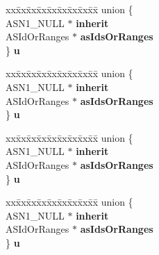 \begin{DoxyCompactItemize}
\begin{tabbing}
\end{tabbing}\item 
\mbox{\label{structASIdentifierChoice__st_a28f064ef4a4521a3db248ab14fa8766b}} 
\begin{tabbing}
xx\=xx\=xx\=xx\=xx\=xx\=xx\=xx\=xx\=\kill
union \{\\
\>ASN1\_NULL $\ast$ {\bfseries inherit}\\
\>ASIdOrRanges $\ast$ {\bfseries asIdsOrRanges}\\
\} {\bfseries u}\\

\end{tabbing}\item 
\mbox{\label{structASIdentifierChoice__st_a52e7ac7704816c49b6c94c3f77e2029f}} 
\begin{tabbing}
xx\=xx\=xx\=xx\=xx\=xx\=xx\=xx\=xx\=\kill
union \{\\
\>ASN1\_NULL $\ast$ {\bfseries inherit}\\
\>ASIdOrRanges $\ast$ {\bfseries asIdsOrRanges}\\
\} {\bfseries u}\\

\end{tabbing}\item 
\mbox{\label{structASIdentifierChoice__st_ad96f8fcb9756a8c516003bdca323acdd}} 
\begin{tabbing}
xx\=xx\=xx\=xx\=xx\=xx\=xx\=xx\=xx\=\kill
union \{\\
\>ASN1\_NULL $\ast$ {\bfseries inherit}\\
\>ASIdOrRanges $\ast$ {\bfseries asIdsOrRanges}\\
\} {\bfseries u}\\

\end{tabbing}\item 
\mbox{\label{structASIdentifierChoice__st_a875a421c426e7347c3b777e9f767a57d}} 
\begin{tabbing}
xx\=xx\=xx\=xx\=xx\=xx\=xx\=xx\=xx\=\kill
union \{\\
\>ASN1\_NULL $\ast$ {\bfseries inherit}\\
\>ASIdOrRanges $\ast$ {\bfseries asIdsOrRanges}\\
\} {\bfseries u}\\


\end{tabbing}
\end{DoxyCompactItemize}
